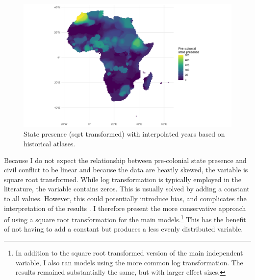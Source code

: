 \documentclass[12pt]{article}
\begin{document}

\begin{figure}[htpb]
	\centering
	\includegraphics[width=\linewidth]{../R/Output/spPlot.pdf} \caption{State presence (sqrt transformed) with interpolated years based on historical atlases.}
	\label{Sp_i}
\end{figure}


Because I do not expect the relationship between pre-colonial state presence and
civil conflict to be linear and because the data are heavily skewed, the
variable is square root transformed. While log transformation is typically
employed in the literature, the variable contains zeros. This is usually solved
by adding a constant to all values. However, this could potentially introduce
bias, and complicates the interpretation of the results \citep{Ekwaru_2018}. I
therefore present the more conservative approach of using a square root
transformation for the main models.\footnote{In addition to the square root
	transformed version of the main independent variable, I also ran models
	using the more common log transformation. The results remained
substantially the same, but with larger effect sizes.} This has the benefit of
not having to add a constant but produces a less evenly distributed variable. 
\end{document}
